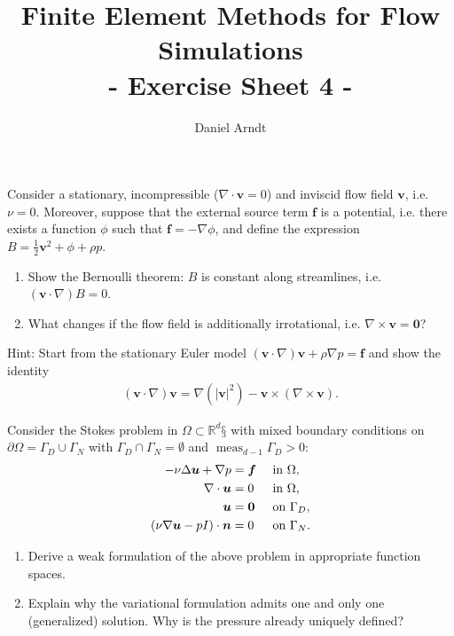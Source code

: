 \documentclass[12pt]{article}
\newcommand{\bu}{\boldsymbol{u}}
\newcommand{\bv}{\boldsymbol{v}}
\newenvironment{exercise}[2][Exercise]{\begin{trivlist}
\item[\hskip \labelsep {\bfseries #1}\hskip \labelsep {\bfseries #2.}]}{\end{trivlist}}
\begin{document}
 
\title{Finite Element Methods for Flow Simulations\\ - Exercise Sheet 4 -}
\author{Daniel Arndt}
\date{}
 
\maketitle

\begin{exercise}{7}
Consider a stationary, incompressible ($\nabla \cdot \bv = 0$) and inviscid flow field $\bv$, i.e. $\nu = 0$. 
Moreover, suppose that the external source term $\boldsymbol{f}$ is a potential, 
i.e. there exists a function $\phi$ such that $\boldsymbol{f} = -\nabla \phi$, 
and define the expression $B = \frac12 \bv^2 + \phi + \rho p$.
\begin{enumerate}
 \item Show the Bernoulli theorem: $B$ is constant along streamlines, i.e. $(\bv \cdot \nabla)B = 0$.
 \item What changes if the flow field is additionally irrotational, i.e. $\nabla \times \bv = \boldsymbol{0}$?
\end{enumerate}
Hint: Start from the stationary Euler model $(\bv \cdot \nabla)\bv + \rho \nabla p = \boldsymbol{f}$ and show the identity
\begin{align*}
(\bv \cdot \nabla)\bv = \nabla( |\bv|^2) - \bv \times (\nabla \times \bv).
\end{align*}

\end{exercise}

\begin{exercise}{8}
Consider the Stokes problem in $\Omega \subset \mathbb{R}^d§$ with mixed boundary conditions on $\partial \Omega = \Gamma_D \cup \Gamma_N$ with
$\Gamma_D \cap \Gamma_N = \emptyset$ and $\operatorname{meas}_{d-1} \Gamma_D > 0$:
\begin{align*}
&\hfill &                  -\nu \Delta \bu + \nabla p &= \boldsymbol{f} &&\text{ in } \Omega,&\hfill\\
&\hfill &                            \nabla \cdot \bu &= 0              &&\text{ in } \Omega,&\hfill\\
&\hfill &                                         \bu &= \boldsymbol{0} &&\text{ on } \Gamma_D,&\hfill\\
&\hfill & (\nu \nabla \bu - p I) \cdot \boldsymbol{n} &= 0              &&\text{ on } \Gamma_N.&\hfill
\end{align*}
\begin{enumerate}
\item Derive a weak formulation of the above problem in appropriate function spaces.
\item Explain why the variational formulation admits one and only one (generalized) solution. Why is
the pressure already uniquely defined?
\end{enumerate}
\end{exercise}
\end{document}
